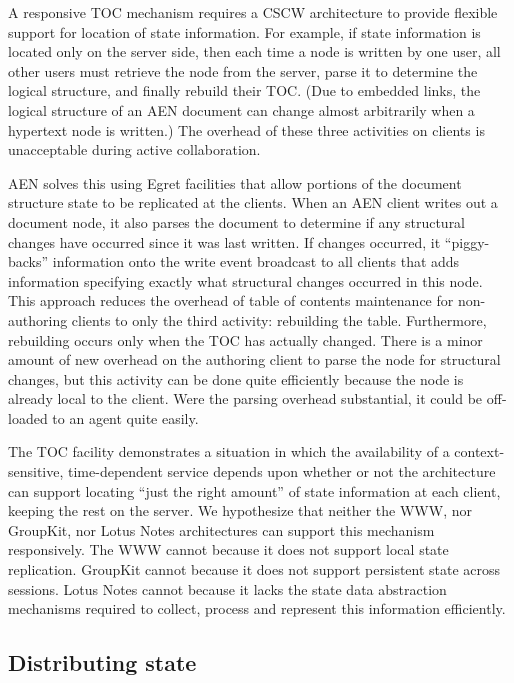 A responsive TOC mechanism requires a CSCW architecture to provide flexible
support for location of state information.  For example, if state
information is located only on the server side, then each time a node is
written by one user, all other users must retrieve the node from the
server, parse it to determine the logical structure, and finally rebuild
their TOC.  (Due to embedded links, the logical structure of an AEN
document can change almost arbitrarily when a hypertext node is written.)
The overhead of these three activities on clients is unacceptable during
active collaboration.


AEN solves this using Egret facilities that allow portions of the document
structure state to be replicated at the clients.  When an AEN client writes
out a document node, it also parses the document to determine if any
structural changes have occurred since it was last written.  If changes
occurred, it ``piggy-backs'' information onto the write event broadcast to
all clients that adds information specifying exactly what structural
changes occurred in this node.  This approach reduces the overhead of table of contents
maintenance for non-authoring clients to only the third activity:
rebuilding the table.  Furthermore, rebuilding occurs only when the
TOC has actually changed. There is a minor amount of new overhead on
the authoring client to parse the node for structural changes, but this
activity can be done quite efficiently because the node is already local to
the client.  Were the parsing overhead substantial, it could be off-loaded
to an agent quite easily.

The TOC facility demonstrates a situation in which the
availability of a context-sensitive, time-dependent service depends upon
whether or not the architecture can support locating ``just the right
amount'' of state information at each client, keeping the rest on the
server. We hypothesize that neither the WWW, nor GroupKit, nor Lotus Notes
architectures can support this mechanism responsively.  The WWW cannot
because it does not support local state replication. GroupKit cannot
because it does not support persistent state across sessions.  Lotus Notes
cannot because it lacks the state data abstraction mechanisms required to
collect, process and represent this information efficiently.


\subsection{Distributing state}

